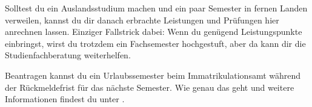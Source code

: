Solltest du ein Auslandsstudium machen und ein paar Semester in fernen Landen verweilen, kannst du dir danach erbrachte Leistungen und Prüfungen hier anrechnen lassen.
Einziger Fallstrick dabei: Wenn du genügend Leistungspunkte einbringst, wirst du trotzdem ein Fachsemester hochgestuft, aber da kann dir die Studienfachberatung weiterhelfen.

Beantragen kannst du ein Urlaubssemester beim Immatrikulationsamt während der Rückmeldefrist für das nächste Semester.
Wie genau das geht und weitere Informationen findest du unter .
